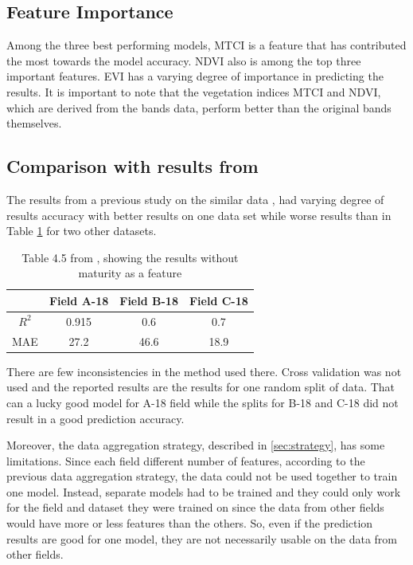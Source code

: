 \documentclass[sigconf, nonacm, natbib, screen, balance=False]{acmart}
\begin{document}
\subsection{Feature Importance}\label{sec:feat_dis}
Among the three best performing models, MTCI is a feature that has contributed the most towards the model accuracy. NDVI also is among the top three important features. EVI has a varying degree of importance in predicting the results. It is important to note that the vegetation indices MTCI and NDVI, which are derived from the bands data, perform better than the original bands themselves.

\subsection{Comparison with results from \citet{lied}}\label{sec:comp_lied}

The results from a previous study on the similar data \citep{lied} , had varying degree of results accuracy with better results on one data set while worse results than in Table \ref{tab:lied19} for two other datasets.

\begin{table}[h!]
  \caption{Table 4.5 from \citep{lied}, showing the results without maturity as a feature}
  \label{tab:lied19}
  \begin{tabular}{|c|c|c|c|}
    \hline

     & \textbf{Field A-18} & \textbf{Field B-18} & \textbf{Field C-18}  \\
    \hline

    $R^2$ & 0.915 & 0.6 & 0.7\\    \hline
    MAE & 27.2 & 46.6 & 18.9\\ \hline
  \end{tabular}
\end{table}

There are few inconsistencies in the method used there. Cross validation was not used and the reported results are the results for one random split of data. That can a lucky good model for A-18 field while the splits for B-18 and C-18 did not result in a good prediction accuracy.

Moreover, the data aggregation strategy, described in \ref{sec:strategy}, has some limitations. Since each field different number of features, according to the previous data aggregation strategy, the data could not be used together to train one model. Instead, separate models had to be trained and they could only work for the field and dataset they were trained on since the data from other fields would have more or less features than the others. So, even if the prediction results are good for one model, they are not necessarily usable on the data from other fields.
\end{document}
